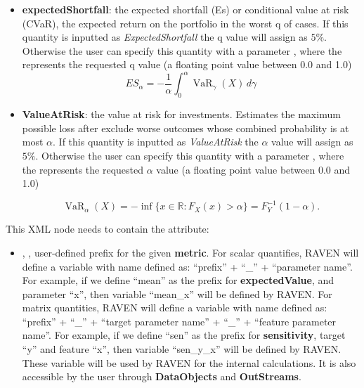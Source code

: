 \begin{itemize}
\begin{itemize}
  
  \item \textbf{expectedShortfall}: the expected shortfall (Es) or conditional value at risk (CVaR), the expected return on the portfolio in the worst q of cases. If this quantity is inputted as \textit{ExpectedShortfall} the q value will assign as $5\%$. Otherwise the user can specify this quantity with a parameter , where the  represents the requested q value (a floating point value between 0.0 and 1.0)
  \begin{equation}
    ES_\alpha = -\frac{1}{\alpha} \int_0^\alpha \operatorname{VaR}_\gamma(X) \, d\gamma
  \end{equation}
  \item \textbf{ValueAtRisk}: the value at risk for investments. Estimates the maximum possible loss after exclude worse outcomes whose combined probability is at most $\alpha$. If this quantity is inputted as \textit{ValueAtRisk} the $\alpha$ value will assign as $5\%$. Otherwise the user can specify this quantity with a parameter , where the  represents the requested $\alpha$ value (a floating point value between 0.0 and 1.0)
  
  \begin{equation}
    \operatorname{VaR}_\alpha(X)=-\inf\big\{x\in\mathbb{R}:F_X(x)>\alpha\big\} = F^{-1}_Y(1-\alpha).
  \end{equation}
  \end{itemize}
  This XML node needs to contain the attribute:
  \begin{itemize}
    \itemsep0em
    \item {}, , user-defined prefix for the given \textbf{metric}.
      For scalar quantifies, RAVEN will define a variable with name defined as:  ``prefix'' + ``\_'' + ``parameter name''.
      For example, if we define ``mean'' as the prefix for \textbf{expectedValue}, and parameter ``x'', then variable
      ``mean\_x'' will be defined by RAVEN.
      For matrix quantities, RAVEN will define a variable with name defined as: ``prefix'' + ``\_'' + ``target parameter name'' + ``\_'' + ``feature parameter name''.
      For example, if we define ``sen'' as the prefix for \textbf{sensitivity}, target ``y'' and feature ``x'', then
      variable ``sen\_y\_x'' will be defined by RAVEN.
      \nb These variable will be used by RAVEN for the internal calculations. It is also accessible by the user through
      \textbf{DataObjects} and \textbf{OutStreams}.
  \end{itemize}

\end{itemize}


